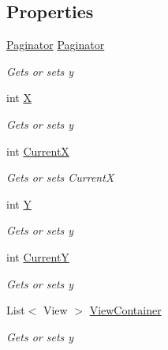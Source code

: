 \subsection*{Properties}
\begin{DoxyCompactItemize}
\item 
\mbox{\hyperlink{class_gtd_app_1_1_repository_1_1_paginator}{Paginator}} \mbox{\hyperlink{class_gtd_app_1_1_console_core_1_1_views_1_1_helpers_1_1_paginator_helper_a925b113996ad9b8818432e4cbbc12d21}{Paginator}}
\begin{DoxyCompactList}\small\item\em Gets or sets y \end{DoxyCompactList}\item 
int \mbox{\hyperlink{class_gtd_app_1_1_console_core_1_1_views_1_1_helpers_1_1_paginator_helper_af051ab1c4e4462602cb99b65fa56e792}{X}}
\begin{DoxyCompactList}\small\item\em Gets or sets y \end{DoxyCompactList}\item 
int \mbox{\hyperlink{class_gtd_app_1_1_console_core_1_1_views_1_1_helpers_1_1_paginator_helper_ab1f106bb4ac16258f6c63da3db4e652e}{CurrentX}}
\begin{DoxyCompactList}\small\item\em Gets or sets CurrentX \end{DoxyCompactList}\item 
int \mbox{\hyperlink{class_gtd_app_1_1_console_core_1_1_views_1_1_helpers_1_1_paginator_helper_aaae02ac5d74cdee0f6dc4c6821e311e9}{Y}}
\begin{DoxyCompactList}\small\item\em Gets or sets y \end{DoxyCompactList}\item 
int \mbox{\hyperlink{class_gtd_app_1_1_console_core_1_1_views_1_1_helpers_1_1_paginator_helper_a79c79785bea49f93d1c61401a79c6dd6}{CurrentY}}
\begin{DoxyCompactList}\small\item\em Gets or sets y \end{DoxyCompactList}\item 
List$<$ View $>$ \mbox{\hyperlink{class_gtd_app_1_1_console_core_1_1_views_1_1_helpers_1_1_paginator_helper_a6c507bd2a5c64885ea7fd59bd6c99eeb}{View\+Container}}
\begin{DoxyCompactList}\small\item\em Gets or sets y \end{DoxyCompactList}\end{DoxyCompactItemize}


